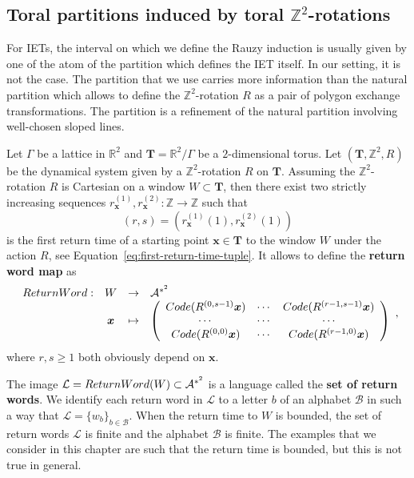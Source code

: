 \documentclass[12pt]{amsart}
\newcommand{\Z}{\mathbb{Z}}
\newcommand{\R}{\mathbb{R}}
\newcommand{\bx}{{\boldsymbol{x}}}
\newcommand{\Acal}{\mathcal{A}} %
\newcommand{\Bcal}{\mathcal{B}}
\newcommand{\Lcal}{\mathcal{L}}
\newcommand{\generictorus}{{\boldsymbol{T}}}
\newcommand{\sccode}{\textsc{Code}}
\newcommand{\scReturnWord}{\textsc{ReturnWord}}
\newcommand{\ifnv}[2]{\ifthenelse{\equal{#1}{}}{}{#2}}
\newcommand\defn[2][]{\ifnv{#1}{\index{#1|\textbf}}{\index{#2|\textbf}}\textbf{#2}}
\begin{document}
\subsection{Toral partitions induced by toral $\Z^2$-rotations}

For IETs, the interval on which we define the Rauzy induction is usually given
by one of the atom of the partition which defines the IET itself. In our setting, it is not the
case. The partition that we use carries more information than the natural
partition which allows to define the $\Z^2$-rotation $R$ as a pair of polygon
exchange transformations.
The partition is a refinement  of the natural partition 
involving well-chosen sloped lines.

Let $\Gamma$ be a lattice in $\R^2$ and
$\generictorus=\R^2/\Gamma$ be a $2$-dimensional torus.
Let $(\generictorus,\Z^2,R)$ be the dynamical system 
given by a $\Z^2$-rotation $R$ on $\generictorus$.
Assuming the $\Z^2$-rotation $R$ is Cartesian on a window $W\subset\generictorus$,
then there exist
two strictly increasing sequences $r_\bx^{(1)},r_\bx^{(2)}:\Z\to\Z$ 
such that
\begin{equation}\label{eq:r-and-s}
    (r,s) = \left(r_\bx^{(1)}(1),r_\bx^{(2)}(1)\right)
\end{equation}
is the first return time of a starting point $\bx\in\generictorus$ to the
window $W$ under the action $R$, see
Equation~\eqref{eq:first-return-time-tuple}.
It allows to define the \defn{return word map} as
\[
\begin{array}{rccl}
    \scReturnWord:&W & \to & \Acal^{*^2}\\
    &\bx&\mapsto &
    \left(\begin{array}{ccc}
        \sccode(R^{(0,s-1)}\bx) & \cdots & 
        \sccode(R^{(r-1,s-1)}\bx)\\
        \cdots & \cdots & \cdots\\
        \sccode(R^{(0,0)}\bx) & \cdots & \sccode(R^{(r-1,0)}\bx)
    \end{array}\right)
\end{array},
\]
where $r,s\geq 1$ both obviously depend on $\bx$.

The image $\Lcal=\scReturnWord(W)\subset \Acal^{*^2}$ is a language called the \defn{set of return words}.
We identify each return word in $\Lcal$ to a letter $b$ of an
alphabet $\Bcal$ in such a way that $\Lcal=\{w_b\}_{b\in\Bcal}$.
When the return time to $W$ is bounded, the set of return words $\Lcal$ is
finite and the alphabet $\Bcal$ is finite. The examples that we consider in this
chapter are such that the return time is bounded, but this is not true in
general.
\end{document}
